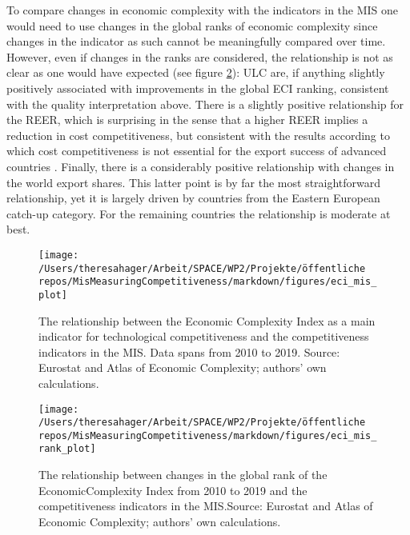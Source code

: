 \documentclass[
]{article}
\begin{document}
To compare changes in economic complexity with the indicators
in the MIS one would need to use changes in the global ranks of economic
complexity since changes in the indicator as such cannot be meaningfully
compared over time. However, even if changes in the ranks are considered, the
relationship is not as clear as one would have expected (see figure
\ref{fig:eciMIScompRanks}): ULC are, if anything slightly positively associated
with improvements in the global ECI ranking, consistent with the quality
interpretation above. There is a slightly positive relationship for the REER,
which is surprising in the sense that a higher REER implies a reduction in cost
competitiveness, but consistent with the results according to which cost
competitiveness is not essential for the export success of advanced countries
\citep[e.g.][]{Carlin.2001, Storm.2015jsi, Dosi.2015}.
Finally, there is a considerably positive relationship with changes in the world
export shares. This latter point is by far the most straightforward relationship,
yet it is largely driven by countries from the Eastern European catch-up
category. For the remaining countries the relationship is moderate at best.

\begin{figure}

{\centering \texttt{[image: /Users/theresahager/Arbeit/SPACE/WP2/Projekte/öffentliche repos/MisMeasuringCompetitiveness/markdown/figures/eci\_mis\_plot]} 

}

\caption{The relationship between the Economic Complexity Index as a main indicator for technological competitiveness and the competitiveness indicators in the MIS. Data spans from 2010 to 2019. Source: Eurostat and Atlas of Economic Complexity; authors' own calculations.}\label{fig:eciMIScomp}
\end{figure}

\begin{figure}

{\centering \texttt{[image: /Users/theresahager/Arbeit/SPACE/WP2/Projekte/öffentliche repos/MisMeasuringCompetitiveness/markdown/figures/eci\_mis\_rank\_plot]} 

}

\caption{The relationship between changes in the global rank of the  EconomicComplexity Index from 2010 to 2019 and the competitiveness indicators in the MIS.Source: Eurostat and Atlas of Economic Complexity; authors' own calculations.}\label{fig:eciMIScompRanks}
\end{figure}
\end{document}
